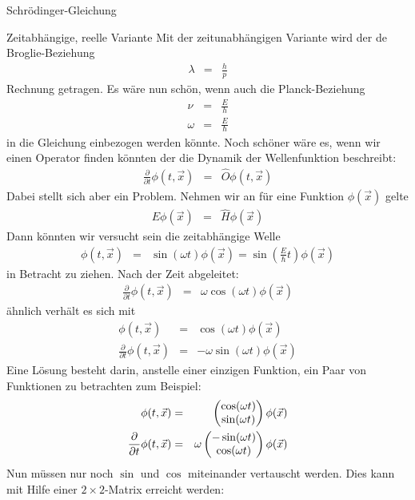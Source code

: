 \begin{chapter}{\titlestr}
\begin{section}{Schrödinger-Gleichung}
\begin{subsection}{Zeitabhängige, reelle Variante}
Mit der zeitunabhängigen Variante wird der de Broglie-Beziehung
\begin{eqnarray*}
\lambda &=&\frac{h}{p}
\end{eqnarray*}
Rechnung getragen. Es wäre nun schön, wenn auch die Planck-Beziehung
\begin{eqnarray*}
\nu &=& \frac{E}{h}\\
\omega &=& \frac{E}{\hbar}
\end{eqnarray*}
in die Gleichung einbezogen werden könnte. Noch schöner wäre es, wenn wir einen Operator finden könnten der die Dynamik der Wellenfunktion beschreibt:
\begin{eqnarray*}
\frac{\partial}{\partial t} \phi(t,\vec{x}) &=& \hat{O}\phi(t,\vec{x})
\end{eqnarray*}
Dabei stellt sich aber ein Problem. Nehmen wir an für eine Funktion $\phi(\vec{x})$ gelte
\begin{eqnarray*}
E\phi(\vec{x}) &=& \hat{H}\phi(\vec{x})
\end{eqnarray*}
Dann könnten wir versucht sein die zeitabhängige Welle
\begin{eqnarray*}
\phi(t,\vec{x}) &=& \sin(\omega t)\phi(\vec{x})=\sin\left(\frac{E}{\hbar} t\right)\phi(\vec{x})
\end{eqnarray*}
in Betracht zu ziehen. Nach der Zeit abgeleitet:
\begin{eqnarray*}
\frac{\partial}{\partial t} \phi(t,\vec{x}) &=& \omega\cos(\omega t)\phi(\vec{x})
\end{eqnarray*}
ähnlich verhält es sich mit
\begin{eqnarray*}
\phi(t,\vec{x}) &=& \cos(\omega t)\phi(\vec{x})\\
\frac{\partial}{\partial t} \phi(t,\vec{x}) &=& -\omega\sin(\omega t)\phi(\vec{x})
\end{eqnarray*}
Eine Lösung besteht darin, anstelle einer einzigen Funktion, ein Paar von Funktionen zu betrachten zum Beispiel:
\begin{eqnarray*}
\phi(t,\vec{x}) &=& \begin{pmatrix}\cos(\omega t)\\ \sin(\omega t)\end{pmatrix}\phi(\vec{x})\\
\frac{\partial}{\partial t} \phi(t,\vec{x}) &=& \omega\begin{pmatrix}-\sin(\omega t)\\ \cos(\omega t)\end{pmatrix}\phi(\vec{x})
\end{eqnarray*}
Nun müssen nur noch $\sin$ und $\cos$ miteinander vertauscht werden. Dies kann mit Hilfe einer $2\times 2$-Matrix erreicht werden:

\end{subsection}
\end{section}
\end{chapter}
